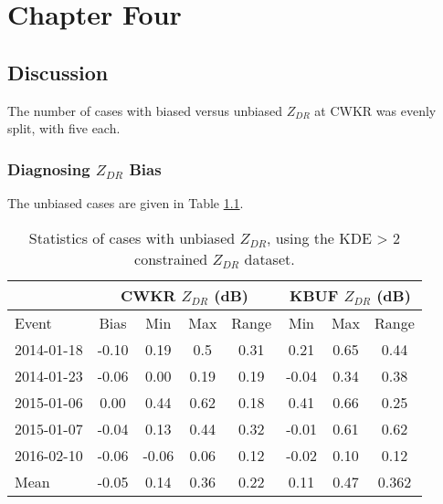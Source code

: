 \chapter{Chapter Four}
\section{Discussion}
The number of cases with biased versus unbiased $Z_{DR}$ at CWKR was evenly split, with five each.
\subsection{Diagnosing $Z_{DR}$ Bias}
The unbiased cases are given in Table \ref{unbiased}.
\begin{table}[h]
    \caption{Statistics of cases with unbiased $Z_{DR}$, using the KDE > 2 constrained $Z_{DR}$ dataset.}\label{unbiased}
    \begin{center}
    \begin{tabular}{|l|c|c|c|c|c|c|c|}
    \hline
     &
    \multicolumn{4}{|c|}{CWKR $Z_{DR}$ (dB)} &
    \multicolumn{3}{|c|}{KBUF $Z_{DR}$ (dB)} \\
    \hline
     Event & Bias & Min & Max & Range & Min & Max & Range\\
    \hline\hline
    2014-01-18 & -0.10 & 0.19 & 0.5 & 0.31 & 0.21 & 0.65 & 0.44 \\
    \hline
    2014-01-23 & -0.06 & 0.00 & 0.19 & 0.19 & -0.04 & 0.34 & 0.38\\
    \hline
    2015-01-06 &  0.00  & 0.44  & 0.62  & 0.18 & 0.41 & 0.66 & 0.25 \\
    \hline
    2015-01-07 & -0.04  & 0.13  & 0.44  & 0.32 & -0.01 & 0.61 & 0.62 \\ 
    \hline
    2016-02-10 & -0.06  & -0.06  & 0.06  & 0.12 &-0.02 & 0.10 & 0.12  \\ 
    \hline\hline
    Mean & -0.05 & 0.14 & 0.36 & 0.22 & 0.11 & 0.47 & 0.362 \\
    \hline
    \end{tabular}
    \end{center}
\end{table}
